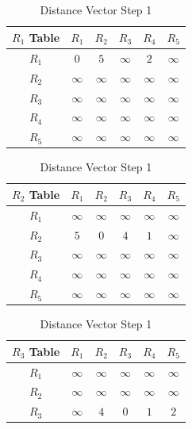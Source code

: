 \documentclass[en]{university}
\begin{document}
\subsection{}
\begin{minipage}[t]{0.5\textwidth}
    \begin{table}[H]
        \centering
        \caption{Distance Vector Step 1}
        \label{tab:dvr1}
        \begin{tabular}{c|*5c}
            $R_1$ Table & $R_1$    & $R_2$    & $R_3$    & $R_4$    & $R_5$    \\
            \hline
            $R_1$       & $0$      & $5$      & $\infty$ & $2$      & $\infty$ \\
            $R_2$       & $\infty$ & $\infty$ & $\infty$ & $\infty$ & $\infty$ \\
            $R_3$       & $\infty$ & $\infty$ & $\infty$ & $\infty$ & $\infty$ \\
            $R_4$       & $\infty$ & $\infty$ & $\infty$ & $\infty$ & $\infty$ \\
            $R_5$       & $\infty$ & $\infty$ & $\infty$ & $\infty$ & $\infty$
        \end{tabular}
        \begin{tabular}{c|*5c}
            $R_2$ Table & $R_1$    & $R_2$    & $R_3$    & $R_4$    & $R_5$    \\
            \hline
            $R_1$       & $\infty$ & $\infty$ & $\infty$ & $\infty$ & $\infty$ \\
            $R_2$       & $5$      & $0$      & $4$      & $1$      & $\infty$ \\
            $R_3$       & $\infty$ & $\infty$ & $\infty$ & $\infty$ & $\infty$ \\
            $R_4$       & $\infty$ & $\infty$ & $\infty$ & $\infty$ & $\infty$ \\
            $R_5$       & $\infty$ & $\infty$ & $\infty$ & $\infty$ & $\infty$
        \end{tabular}
        \begin{tabular}{c|*5c}
            $R_3$ Table & $R_1$    & $R_2$    & $R_3$    & $R_4$    & $R_5$    \\
            \hline
            $R_1$       & $\infty$ & $\infty$ & $\infty$ & $\infty$ & $\infty$ \\
            $R_2$       & $\infty$ & $\infty$ & $\infty$ & $\infty$ & $\infty$ \\
            $R_3$       & $\infty$ & $4$      & $0$      & $1$      & $2$      \\

\end{tabular}
\end{table}
\end{minipage}
\end{document}
